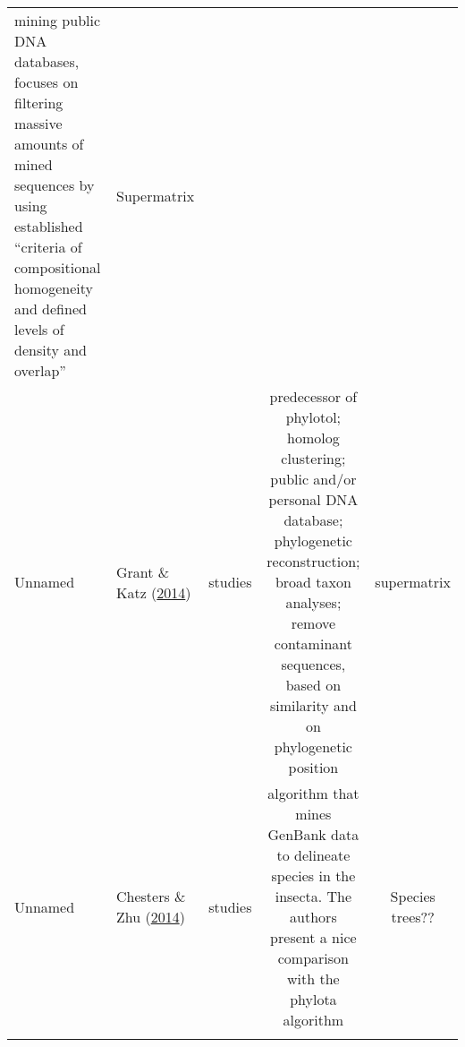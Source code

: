 \documentclass[]{article}
\begin{document}
\begin{longtable}[]{@{}llccc@{}}
\begin{minipage}[t]{0.20\columnwidth}
mining public DNA databases, focuses on filtering massive amounts of mined sequences by using established ``criteria of compositional homogeneity and defined levels of density and overlap''\strut
\end{minipage} & \begin{minipage}[t]{0.20\columnwidth}\centering
Supermatrix\strut
\end{minipage}\tabularnewline
\begin{minipage}[t]{0.12\columnwidth}\raggedright
Unnamed\strut
\end{minipage} & \begin{minipage}[t]{0.15\columnwidth}\raggedright
Grant \& Katz (\protect\hyperlink{ref-grant2014building}{2014})\strut
\end{minipage} & \begin{minipage}[t]{0.20\columnwidth}\centering
38 studies\strut
\end{minipage} & \begin{minipage}[t]{0.20\columnwidth}\centering
predecessor of phylotol; homolog clustering; public and/or personal DNA database; phylogenetic reconstruction; broad taxon analyses; remove contaminant sequences, based on similarity and on phylogenetic position\strut
\end{minipage} & \begin{minipage}[t]{0.20\columnwidth}\centering
supermatrix\strut
\end{minipage}\tabularnewline
\begin{minipage}[t]{0.12\columnwidth}\raggedright
Unnamed\strut
\end{minipage} & \begin{minipage}[t]{0.15\columnwidth}\raggedright
Chesters \& Zhu (\protect\hyperlink{ref-chesters2014protocol}{2014})\strut
\end{minipage} & \begin{minipage}[t]{0.20\columnwidth}\centering
10 studies\strut
\end{minipage} & \begin{minipage}[t]{0.20\columnwidth}\centering
algorithm that mines GenBank data to delineate species in the insecta. The authors present a nice comparison with the phylota algorithm\strut
\end{minipage} & \begin{minipage}[t]{0.20\columnwidth}\centering
Species trees??\strut
\end{minipage}\tabularnewline
\begin{minipage}[t]{0.12\columnwidth}\raggedright

\end{minipage}
\end{longtable}
\end{document}
